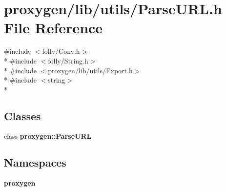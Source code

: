 \section{proxygen/lib/utils/\+Parse\+U\+RL.h File Reference}
\label{ParseURL_8h}
{\ttfamily \#include $<$folly/\+Conv.\+h$>$}\\*
{\ttfamily \#include $<$folly/\+String.\+h$>$}\\*
{\ttfamily \#include $<$proxygen/lib/utils/\+Export.\+h$>$}\\*
{\ttfamily \#include $<$string$>$}\\*
\subsection*{Classes}
\begin{DoxyCompactItemize}
\item 
class {\bf proxygen\+::\+Parse\+U\+RL}
\end{DoxyCompactItemize}
\subsection*{Namespaces}
\begin{DoxyCompactItemize}
\item 
 {\bf proxygen}
\end{DoxyCompactItemize}
